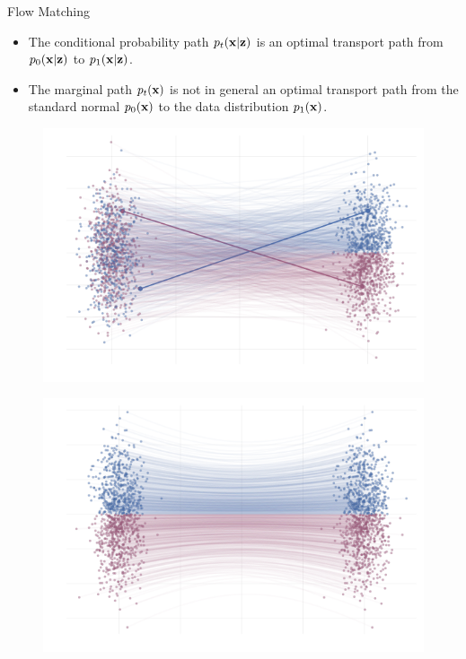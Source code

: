 \begin{frame}{Flow Matching}
	\begin{itemize}
		\item The conditional probability path $p_t(\mathbf{x}|\mathbf{z})$ is an optimal transport path from $p_0(\mathbf{x}|\mathbf{z})$ to $p_1(\mathbf{x}|\mathbf{z})$.
		\item The marginal path $p_t(\mathbf{x})$ is not in general an optimal transport path from the standard normal $p_0(\mathbf{x})$ to the data distribution $p_1(\mathbf{x})$.
	\end{itemize}
	\begin{minipage}[t]{0.5\columnwidth}
			\begin{figure}
				\centering
				\includegraphics[width=\linewidth]{figs/g2g-vector-field-samples-cond}
			\end{figure}
		\end{minipage}%
		\begin{minipage}[t]{0.5\columnwidth}
			\begin{figure}
				\centering
				\includegraphics[width=\linewidth]{figs/g2g-forward_samples}
			\end{figure}
	\end{minipage}
\end{frame}
